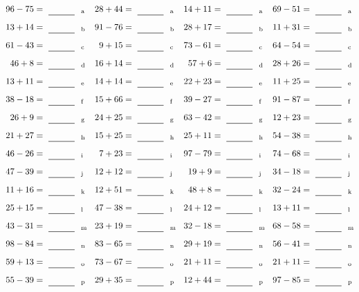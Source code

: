 \documentclass
[
  draft    = true,
  fontsize = 11pt,
  parskip  = half-
]
{scrartcl}
\begin{document}
\clearpage
\begin{align*}
    \pline{96-75}&=\rline{a}
  & \pline{28+44}&=\rline{a}
  & \pline{14+11}&=\rline{a}
  & \pline{69-51}&=\rline{a} \\[1ex]
    \pline{13+14}&=\rline{b}
  & \pline{91-76}&=\rline{b}
  & \pline{28+17}&=\rline{b}
  & \pline{11+31}&=\rline{b} \\[1ex]
    \pline{61-43}&=\rline{c}
  & \pline{9+15}&=\rline{c}
  & \pline{73-61}&=\rline{c}
  & \pline{64-54}&=\rline{c} \\[1ex]
    \pline{46+8}&=\rline{d}
  & \pline{16+14}&=\rline{d}
  & \pline{57+6}&=\rline{d}
  & \pline{28+26}&=\rline{d} \\[1ex]
    \pline{13+11}&=\rline{e}
  & \pline{14+14}&=\rline{e}
  & \pline{22+23}&=\rline{e}
  & \pline{11+25}&=\rline{e} \\[1ex]
    \pline{38-18}&=\rline{f}
  & \pline{15+66}&=\rline{f}
  & \pline{39-27}&=\rline{f}
  & \pline{91-87}&=\rline{f} \\[1ex]
    \pline{26+9}&=\rline{g}
  & \pline{24+25}&=\rline{g}
  & \pline{63-42}&=\rline{g}
  & \pline{12+23}&=\rline{g} \\[1ex]
    \pline{21+27}&=\rline{h}
  & \pline{15+25}&=\rline{h}
  & \pline{25+11}&=\rline{h}
  & \pline{54-38}&=\rline{h} \\[1ex]
    \pline{46-26}&=\rline{i}
  & \pline{7+23}&=\rline{i}
  & \pline{97-79}&=\rline{i}
  & \pline{74-68}&=\rline{i} \\[1ex]
    \pline{47-39}&=\rline{j}
  & \pline{12+12}&=\rline{j}
  & \pline{19+9}&=\rline{j}
  & \pline{34-18}&=\rline{j} \\[1ex]
    \pline{11+16}&=\rline{k}
  & \pline{12+51}&=\rline{k}
  & \pline{48+8}&=\rline{k}
  & \pline{32-24}&=\rline{k} \\[1ex]
    \pline{25+15}&=\rline{l}
  & \pline{47-38}&=\rline{l}
  & \pline{24+12}&=\rline{l}
  & \pline{13+11}&=\rline{l} \\[1ex]
    \pline{43-31}&=\rline{m}
  & \pline{23+19}&=\rline{m}
  & \pline{32-18}&=\rline{m}
  & \pline{68-58}&=\rline{m} \\[1ex]
    \pline{98-84}&=\rline{n}
  & \pline{83-65}&=\rline{n}
  & \pline{29+19}&=\rline{n}
  & \pline{56-41}&=\rline{n} \\[1ex]
    \pline{59+13}&=\rline{o}
  & \pline{73-67}&=\rline{o}
  & \pline{21+11}&=\rline{o}
  & \pline{21+11}&=\rline{o} \\[1ex]
    \pline{55-39}&=\rline{p}
  & \pline{29+35}&=\rline{p}
  & \pline{12+44}&=\rline{p}
  & \pline{97-85}&=\rline{p}
\end{align*}
\end{document}
